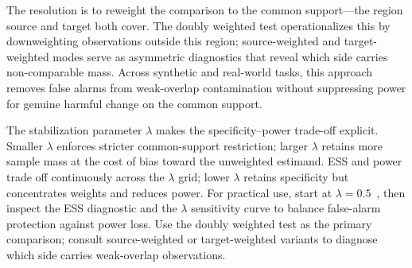 The resolution is to reweight the comparison to the common support---the region source and target both cover. The doubly weighted test operationalizes this by downweighting observations outside this region; source-weighted and target-weighted modes serve as asymmetric diagnostics that reveal which side carries non-comparable mass. Across synthetic and real-world tasks, this approach removes false alarms from weak-overlap contamination without suppressing power for genuine harmful change on the common support.

The stabilization parameter $\lambda$ makes the specificity--power trade-off explicit. Smaller $\lambda$ enforces stricter common-support restriction; larger $\lambda$ retains more sample mass at the cost of bias toward the unweighted estimand. ESS and power trade off continuously across the $\lambda$ grid; lower $\lambda$ retains specificity but concentrates weights and reduces power. For practical use, start at $\lambda = 0.5$~\cite{Yamada_2013}, then inspect the ESS diagnostic and the $\lambda$ sensitivity curve to balance false-alarm protection against power loss. Use the doubly weighted test as the primary comparison; consult source-weighted or target-weighted variants to diagnose which side carries weak-overlap observations.
